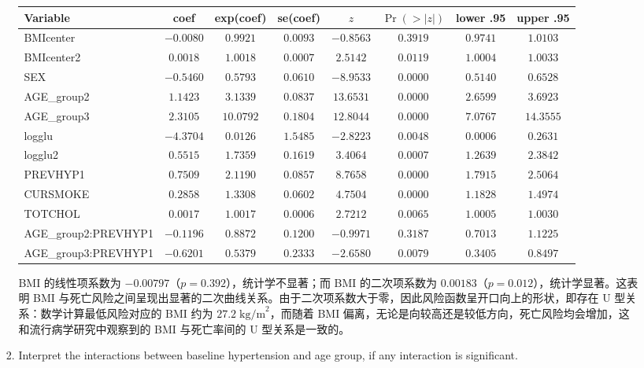 \begin{enumerate}
\begin{enumerate}[label=(\alph*)]
\begin{enumerate}[label=\roman*.]
\begin{center}
\footnotesize
\begin{tabular}{lccccccc}
\toprule
Variable & coef & exp(coef) & se(coef) & $z$ & $\Pr(>|z|)$ & lower .95 & upper .95 \\
\midrule
BMIcenter        & $-0.0080$ & $0.9921$ & $0.0093$ & $-0.8563$ & $0.3919$ & $0.9741$ & $1.0103$ \\
BMIcenter2       & $0.0018$  & $1.0018$ & $0.0007$ & $2.5142$  & $0.0119$ & $1.0004$ & $1.0033$ \\
SEX              & $-0.5460$ & $0.5793$ & $0.0610$ & $-8.9533$ & $0.0000$ & $0.5140$ & $0.6528$ \\
AGE\_group2      & $1.1423$  & $3.1339$ & $0.0837$ & $13.6531$ & $0.0000$ & $2.6599$ & $3.6923$ \\
AGE\_group3      & $2.3105$  & $10.0792$& $0.1804$ & $12.8044$ & $0.0000$ & $7.0767$ & $14.3555$\\
logglu           & $-4.3704$ & $0.0126$ & $1.5485$ & $-2.8223$ & $0.0048$ & $0.0006$ & $0.2631$ \\
logglu2          & $0.5515$  & $1.7359$ & $0.1619$ & $3.4064$  & $0.0007$ & $1.2639$ & $2.3842$ \\
PREVHYP1         & $0.7509$  & $2.1190$ & $0.0857$ & $8.7658$  & $0.0000$ & $1.7915$ & $2.5064$ \\
CURSMOKE         & $0.2858$  & $1.3308$ & $0.0602$ & $4.7504$  & $0.0000$ & $1.1828$ & $1.4974$ \\
TOTCHOL          & $0.0017$  & $1.0017$ & $0.0006$ & $2.7212$  & $0.0065$ & $1.0005$ & $1.0030$ \\
AGE\_group2:PREVHYP1 & $-0.1196$ & $0.8872$ & $0.1200$ & $-0.9971$ & $0.3187$ & $0.7013$ & $1.1225$ \\
AGE\_group3:PREVHYP1 & $-0.6201$ & $0.5379$ & $0.2333$ & $-2.6580$ & $0.0079$ & $0.3405$ & $0.8497$ \\
\bottomrule
\end{tabular}
\end{center}

BMI 的线性项系数为 $-0.00797$（$p=0.392$），统计学不显著；而 BMI 的二次项系数为 $0.00183$（$p=0.012$），统计学显著。这表明 BMI 与死亡风险之间呈现出显著的二次曲线关系。由于二次项系数大于零，因此风险函数呈开口向上的形状，即存在 U 型关系：数学计算最低风险对应的 BMI 约为 $27.2\;\text{kg/m}^2$，而随着 BMI 偏离，无论是向较高还是较低方向，死亡风险均会增加，这和流行病学研究中观察到的 BMI 与死亡率间的 U 型关系是一致的。

\item Interpret the interactions between baseline hypertension and age group, if any interaction is significant.


\end{enumerate}
\end{enumerate}
\end{enumerate}
